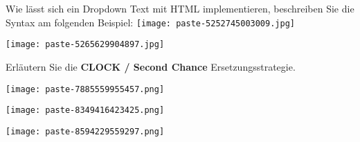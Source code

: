 \documentclass{article}
\begin{document}
\begin{tcolorbox}[colback=white!10!white,colframe=lightgray!75!black,
  savelowerto=\jobname_ex.tex,breakable,enhanced,lines before break=50]

\begin{center}
 Wie lässt sich ein Dropdown Text mit HTML implementieren, beschreiben Sie die Syntax am folgenden Beispiel:
\texttt{[image: paste-5252745003009.jpg]}
 

\end{center}

\tcblower

\justifying
\texttt{[image: paste-5265629904897.jpg]}

\end{tcolorbox}
\begin{tcolorbox}[colback=white!10!white,colframe=lightgray!75!black,
  savelowerto=\jobname_ex.tex,breakable,enhanced,lines before break=50]

\begin{center}
 Erläutern Sie die 
\textbf{CLOCK / Second Chance
}Ersetzungsstrategie. 

\end{center}

\tcblower

\justifying
\texttt{[image: paste-7885559955457.png]}

\end{tcolorbox}
\begin{tcolorbox}[colback=white!10!white,colframe=lightgray!75!black,
  savelowerto=\jobname_ex.tex,breakable,enhanced,lines before break=50]

\begin{center}
 
\texttt{[image: paste-8349416423425.png]}
 

\end{center}

\tcblower

\justifying
\texttt{[image: paste-8594229559297.png]}

\end{tcolorbox}
\end{document}
